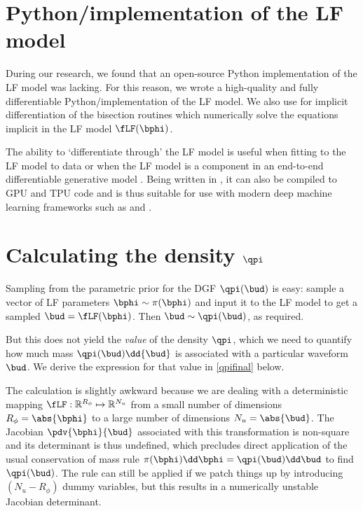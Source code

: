 \begin{chapterappendices}{4}

\section{Python/\JAX implementation of the LF model\label{lf-jax}}

During our research, we found that an open-source Python implementation of the LF model was lacking.
For this reason, we wrote a high-quality and fully differentiable Python/\JAX implementation \citep{Bradbury2020} of the LF model.
We also use \JAXopt \citep{Blondel2021} for implicit differentiation of the bisection routines which numerically solve the equations implicit in the LF model $\fLF(\bphi)$. %

The ability to `differentiate through' the LF model is useful when fitting to the LF model to data or when the LF model is a component in an end-to-end differentiable generative model \citep[e.g.,~][]{Degottex2010,Drugman2019,Alzamendi2017,Schleusing2012,Alku2011,Perrotin2017}.
Being written in \JAX, it can also be compiled to GPU and TPU code and is thus suitable for use with modern deep machine learning frameworks such as  \citep{Heek2020} and  \citep{Abadi2015}.

\section{Calculating the density $\qpi$}

Sampling from the parametric prior for the DGF $\qpi(\bud)$ is easy:
sample a vector of LF parameters $\bphi \sim \pi(\bphi)$ and input it to the LF model to get a sampled $\bud = \fLF(\bphi)$.
Then $\bud \sim \qpi(\bud)$, as required.

But this does not yield the \emph{value} of the density $\qpi$, which we need to quantify how much mass $\qpi(\bud) \dd{\bud}$ is associated with a particular waveform $\bud$.
We derive the expression for that value in \eqref{qpifinal} below.

The calculation is slightly awkward because we are dealing with a deterministic mapping $\fLF: \mathbb{R}^{R_\phi} \mapsto \mathbb{R}^{N_u}$ from a small number of dimensions $R_\phi = \abs{\bphi}$ to a large number of dimensions $N_u = \abs{\bud}$.
The Jacobian $\pdv{\bphi}{\bud}$ associated with this transformation is non-square and its determinant is thus undefined, which precludes direct application of the usual conservation of mass rule $\pi(\bphi) \dd\bphi = \qpi(\bud) \dd\bud$ to find $\qpi(\bud)$.
The rule can still be applied if we patch things up by introducing $(N_u - R_\phi)$ dummy variables, but this results in a numerically unstable Jacobian determinant.


\end{chapterappendices}
